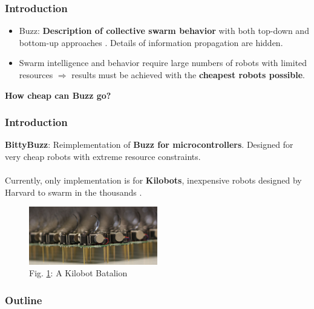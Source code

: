 \documentclass{beamer}
\begin{document}
	\begin{frame}
		\titlepage
	\end{frame}
	\begin{frame}
		\frametitle{Introduction}
		\begin{itemize}
			\item Buzz: \textbf{Description of collective swarm behavior} with both top-down and bottom-up approaches \cite{buzz_arxiv}. Details of information propagation are hidden.
			\item Swarm intelligence and behavior require large numbers of robots with limited resources $\Rightarrow$ results must be achieved with the \textbf{cheapest robots possible}.
		\end{itemize}

		\centering \Large
		\textbf{How cheap can Buzz go?}
	\end{frame}
	\begin{frame}
		\frametitle{Introduction}
		\textbf{BittyBuzz}: Reimplementation of \textbf{Buzz for microcontrollers}. Designed for very cheap robots with extreme resource constraints.\\
		~\\
		Currently, only implementation is for \textbf{Kilobots}, inexpensive robots designed by Harvard to swarm in the thousands \cite{kilobot_paper}.
		\begin{figure}
			\includegraphics[width=0.5\textwidth]{swarm2}
			\caption{\label{figure:Kilobots}Fig. \ref{figure:Kilobots}: A Kilobot Batalion \cite{kilobot_pic}}
		\end{figure}
	\end{frame}
	\begin{frame}
		\frametitle{Outline}
		\tableofcontents
	\end{frame}
\end{document}
